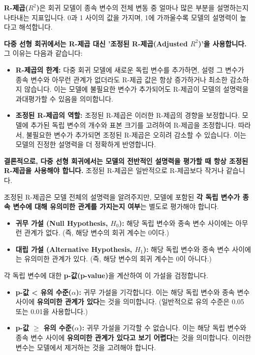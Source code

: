 \documentclass[11pt,a4paper]{article}
\begin{document}
\begin{tcolorbox}[title=\textbf{R-제곱($R^2$)과 조정된 R-제곱(Adjusted $R^2$)}]
\textbf{R-제곱($R^2$)}은 회귀 모델이 종속 변수의 전체 변동 중 얼마나 많은 부분을 설명하는지 나타내는 지표입니다. 0과 1 사이의 값을 가지며, 1에 가까울수록 모델의 설명력이 높다고 해석합니다.

\textbf{다중 선형 회귀에서는 R-제곱 대신 '조정된 R-제곱(Adjusted $R^2$)'을 사용합니다.}
그 이유는 다음과 같습니다:
\begin{itemize}
    \item \textbf{R-제곱의 한계:} 다중 회귀 모델에 새로운 독립 변수를 추가하면, 설령 그 변수가 종속 변수와 아무런 관계가 없더라도 R-제곱 값은 항상 증가하거나 최소한 감소하지 않습니다. 이는 모델에 불필요한 변수가 추가되어도 R-제곱이 모델의 설명력을 과대평가할 수 있음을 의미합니다.
    \item \textbf{조정된 R-제곱의 역할:} 조정된 R-제곱은 이러한 R-제곱의 경향을 보정합니다. 모델에 추가된 독립 변수의 개수와 표본 크기를 고려하여 R-제곱을 조정합니다. 따라서, 불필요한 변수가 추가되면 조정된 R-제곱은 오히려 감소할 수 있습니다. 이는 모델의 진정한 설명력을 더 정확하게 반영합니다.
\end{itemize}
\textbf{결론적으로, 다중 선형 회귀에서는 모델의 전반적인 설명력을 평가할 때 항상 조정된 R-제곱을 사용해야 합니다.} 조정된 R-제곱은 일반적으로 R-제곱보다 작거나 같습니다.
\end{tcolorbox}

\begin{tcolorbox}[title=\textbf{변수의 유의성 검정 (Testing the Significance)}]
조정된 R-제곱은 모델 전체의 설명력을 알려주지만, 모델에 포함된 \textbf{각 독립 변수가 종속 변수에 대해 유의미한 관계를 가지는지 여부}는 별도로 평가해야 합니다.

\begin{itemize}
    \item \textbf{귀무 가설 (Null Hypothesis, $H_0$):} 해당 독립 변수와 종속 변수 사이에는 아무런 관계가 없다. (즉, 해당 변수의 회귀 계수는 0이다.)
    \item \textbf{대립 가설 (Alternative Hypothesis, $H_1$):} 해당 독립 변수와 종속 변수 사이에는 유의미한 관계가 있다. (즉, 해당 변수의 회귀 계수는 0이 아니다.)
\end{itemize}
각 독립 변수에 대한 \textbf{p-값(p-value)}을 계산하여 이 가설을 검정합니다.
\begin{itemize}
    \item \textbf{p-값 < 유의 수준($\alpha$):} 귀무 가설을 기각합니다. 이는 해당 독립 변수와 종속 변수 사이에 \textbf{유의미한 관계가 있다}는 것을 의미합니다. (일반적으로 유의 수준은 0.05 또는 0.01을 사용합니다.)
    \item \textbf{p-값 $\ge$ 유의 수준($\alpha$):} 귀무 가설을 기각할 수 없습니다. 이는 해당 독립 변수와 종속 변수 사이에 \textbf{유의미한 관계가 있다고 보기 어렵다}는 것을 의미합니다. 이러한 변수는 모델에서 제거하는 것을 고려해야 합니다.
\end{itemize}
\end{tcolorbox}
\end{document}
